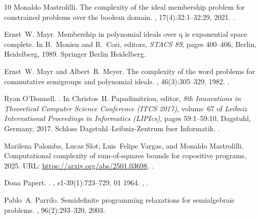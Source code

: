 \documentclass[11pt]{article}
\newcommand{\1}{\textbf{1}}
\begin{document}
\begin{thebibliography}{10}
Monaldo Mastrolilli.
\newblock The complexity of the ideal membership problem for constrained problems over the boolean domain.
, 17(4):32:1--32:29, 2021.
\newblock \href {https://doi.org/10.1145/3449350} {}.

Ernst~W. Mayr.
\newblock Membership in polynomial ideals over q is exponential space complete.
\newblock In B.~Monien and R.~Cori, editors, {\em STACS 89}, pages 400--406, Berlin, Heidelberg, 1989. Springer Berlin Heidelberg.

Ernst~W. Mayr and Albert~R. Meyer.
\newblock The complexity of the word problems for commutative semigroups and polynomial ideals.
, 46(3):305--329, 1982.
\newblock \href {https://doi.org/10.1016/0001-8708(82)90048-2} {}.

Ryan O'Donnell.
.
\newblock In Christos~H. Papadimitriou, editor, {\em 8th Innovations in Theoretical Computer Science Conference (ITCS 2017)}, volume~67 of {\em Leibniz International Proceedings in Informatics (LIPIcs)}, pages 59:1--59:10, Dagstuhl, Germany, 2017. Schloss Dagstuhl--Leibniz-Zentrum fuer Informatik.
\newblock \href {https://doi.org/10.4230/LIPIcs.ITCS.2017.59} {}.

Marilena Palomba, Lucas Slot, Luis~Felipe Vargas, and Monaldo Mastrolilli.
\newblock Computational complexity of sum-of-squares bounds for copositive programs, 2025.
\newblock URL: \url{https://arxiv.org/abs/2501.03698}, \href {https://arxiv.org/abs/2501.03698} {}.

Dona Papert.
.
, s1-39(1):723--729, 01 1964.
\newblock \href {https://arxiv.org/abs/https://academic.oup.com/jlms/article-pdf/s1-39/1/723/2721805/s1-39-1-723.pdf} {}, \href {https://doi.org/10.1112/jlms/s1-39.1.723} {}.

Pablo~A. Parrilo.
\newblock Semidefinite programming relaxations for semialgebraic problems.
, 96(2):293--320, 2003.


\end{thebibliography}
\end{document}
